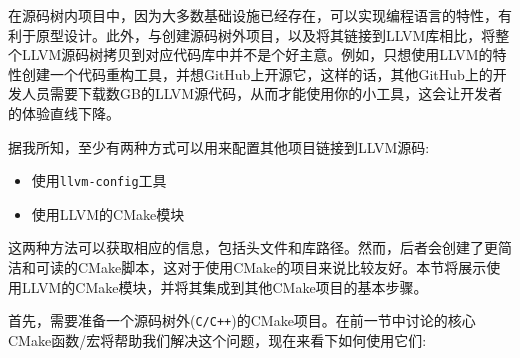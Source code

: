 在源码树内项目中，因为大多数基础设施已经存在，可以实现编程语言的特性，有利于原型设计。此外，与创建源码树外项目，以及将其链接到LLVM库相比，将整个LLVM源码树拷贝到对应代码库中并不是个好主意。例如，只想使用LLVM的特性创建一个代码重构工具，并想GitHub上开源它，这样的话，其他GitHub上的开发人员需要下载数GB的LLVM源代码，从而才能使用你的小工具，这会让开发者的体验直线下降。

据我所知，至少有两种方式可以用来配置其他项目链接到LLVM源码:

\begin{itemize}
\item 使用\texttt{llvm-config}工具

\item 使用LLVM的CMake模块
	
\end{itemize}

这两种方法可以获取相应的信息，包括头文件和库路径。然而，后者会创建了更简洁和可读的CMake脚本，这对于使用CMake的项目来说比较友好。本节将展示使用LLVM的CMake模块，并将其集成到其他CMake项目的基本步骤。

首先，需要准备一个源码树外(\texttt{C/C++})的CMake项目。在前一节中讨论的核心CMake函数/宏将帮助我们解决这个问题，现在来看下如何使用它们:

